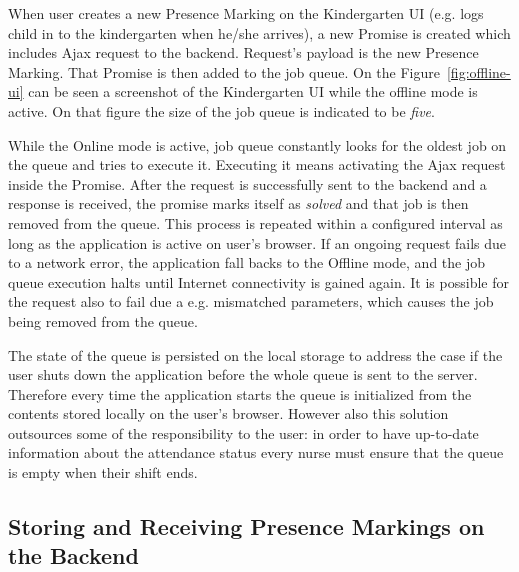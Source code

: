 When user creates a new Presence Marking on the Kindergarten UI (e.g. logs child in to the kindergarten when he/she arrives), a new Promise is created which includes Ajax request to the backend. Request's payload is the new Presence Marking. That Promise is then added to the job queue. On the Figure~\ref{fig:offline-ui} can be seen a screenshot of the Kindergarten UI while the offline mode is active. On that figure the size of the job queue is indicated to be \textit{five}.

While the Online mode is active, job queue constantly looks for the oldest job on the queue and tries to execute it. Executing it means activating the Ajax request inside the Promise. After the request is successfully sent to the backend and a response is received, the promise marks itself as \textit{solved} and that job is then removed from the queue. This process is repeated within a configured interval as long as the application is active on user's browser. If an ongoing request fails due to a network error, the application fall backs to the Offline mode, and the job queue execution halts until Internet connectivity is gained again. It is possible for the request also to fail due a e.g. mismatched parameters, which causes the job being removed from the queue.

The state of the queue is persisted on the local storage to address the case if the user shuts down the application before the whole queue is sent to the server. Therefore every time the application starts the queue is initialized from the contents stored locally on the user's browser. However also this solution outsources some of the responsibility to the user: in order to have up-to-date information about the attendance status every nurse must ensure that the queue is empty when their shift ends.  %









\subsection{Storing and Receiving Presence Markings on the Backend}
\label{subsec:backend-implementation}

